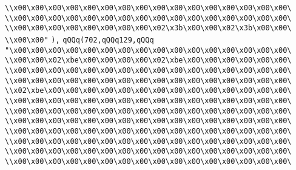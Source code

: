 \verb|\\x00\x00\x00\x00\x00\x00\x00\x00\x00\x00\x00\x00\x00\x00\x00\x00\|\newline
\verb|\\x00\x00\x00\x00\x00\x00\x00\x00\x00\x00\x00\x00\x00\x00\x00\x00\|\newline
\verb|\\x00\x00\x00\x00\x00\x00\x00\x00\x02\x3b\x00\x00\x02\x3b\x00\x00\|\newline
\verb|\\x00\x00"|\newline
\verb|),|\newline
\verb|qQQq(702,qQQq129,qQQq|\newline
\verb|"\x00\x00\x00\x00\x00\x00\x00\x00\x00\x00\x00\x00\x00\x00\x00\x00\|\newline
\verb|\\x00\x00\x02\xbe\x00\x00\x00\x00\x02\xbe\x00\x00\x00\x00\x00\x00\|\newline
\verb|\\x00\x00\x00\x00\x00\x00\x00\x00\x00\x00\x00\x00\x00\x00\x00\x00\|\newline
\verb|\\x00\x00\x00\x00\x00\x00\x00\x00\x00\x00\x00\x00\x00\x00\x00\x00\|\newline
\verb|\\x02\xbe\x00\x00\x00\x00\x00\x00\x00\x00\x00\x00\x00\x00\x00\x00\|\newline
\verb|\\x00\x00\x00\x00\x00\x00\x00\x00\x00\x00\x00\x00\x00\x00\x00\x00\|\newline
\verb|\\x00\x00\x00\x00\x00\x00\x00\x00\x00\x00\x00\x00\x00\x00\x00\x00\|\newline
\verb|\\x00\x00\x00\x00\x00\x00\x00\x00\x00\x00\x00\x00\x00\x00\x00\x00\|\newline
\verb|\\x00\x00\x00\x00\x00\x00\x00\x00\x00\x00\x00\x00\x00\x00\x00\x00\|\newline
\verb|\\x00\x00\x00\x00\x00\x00\x00\x00\x00\x00\x00\x00\x00\x00\x00\x00\|\newline
\verb|\\x00\x00\x00\x00\x00\x00\x00\x00\x00\x00\x00\x00\x00\x00\x00\x00\|\newline
\verb|\\x00\x00\x00\x00\x00\x00\x00\x00\x00\x00\x00\x00\x00\x00\x00\x00\|\newline
